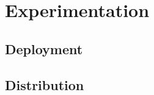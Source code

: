 \documentclass[thesis.tex]{subfiles}
\begin{document}
\chapter{Experimentation}

\section{Deployment}

\section{Distribution}
\end{document}

